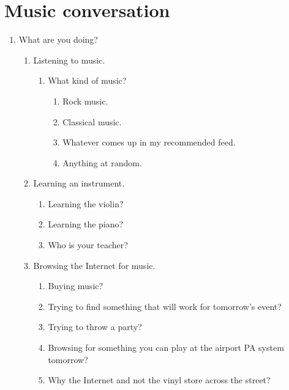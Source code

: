 \section{Music conversation}

\begin{enumerate}
    \item What are you doing?
        \begin{enumerate}
            \item Listening to music.
            \begin{enumerate}
                \item What kind of music?
                \begin{enumerate}
                    \item Rock music.
                    \item Classical music.
                    \item Whatever comes up in my recommended feed.
                    \item Anything at random.
                \end{enumerate}
            \end{enumerate}
            \item Learning an instrument.
            \begin{enumerate}
                \item Learning the violin?
                \item Learning the piano?
                \item Who is your teacher?
            \end{enumerate}
            \item Browsing the Internet for music.
            \begin{enumerate}
                \item Buying music?
                \item Trying to find something that will work for tomorrow's event?
                \item Trying to throw a party?
                \item Browsing for something you can play at the airport PA system tomorrow?
                \item Why the Internet and not the vinyl store across the street?
            \end{enumerate}
        \end{enumerate}
\end{enumerate}